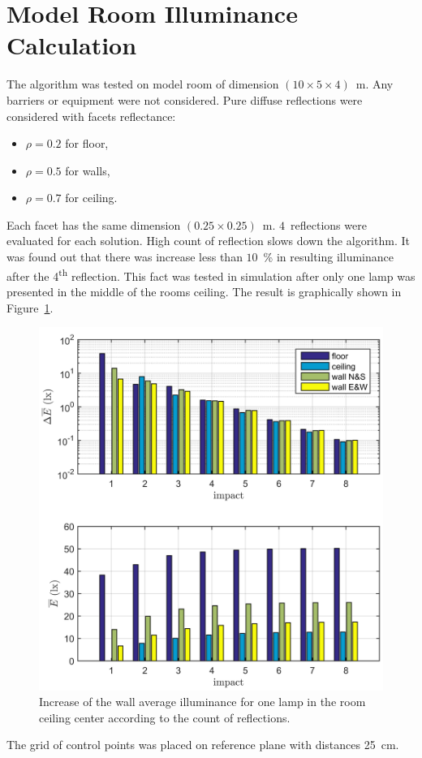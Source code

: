 \section{Model Room Illuminance Calculation}
The algorithm was tested on model room of dimension $\left(10 \times 5 \times 4\right)$~m. Any barriers or equipment were not considered. Pure diffuse reflections were considered with facets reflectance:
\begin{itemize}
	\item $\rho = 0.2$ for floor,
	\item $\rho = 0.5$ for walls,
	\item $\rho = 0.7$ for ceiling.
\end{itemize}
Each facet has the same dimension $\left(0.25 \times 0.25\right)$~m. $4$~reflections were evaluated for each solution. High count of reflection slows down the algorithm. It was found out that there was increase less than $10$~\% in resulting illuminance after the 4\textsuperscript{th} reflection. This fact was tested in simulation after only one lamp was presented in the middle of the rooms ceiling. The result is graphically shown in Figure~\ref{fig:reflDif}.

\begin{figure}[htb]
  \centering
  \includegraphics[width=\columnwidth]{reflDif}
  \caption{Increase of the wall average illuminance for one lamp in the room ceiling center according to the count of reflections.}
  \label{fig:reflDif}
\end{figure}

The grid of control points was placed on reference plane with distances 25~cm.